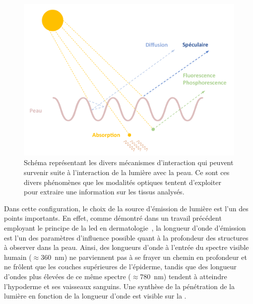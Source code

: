 \begin{figure}[H]
    \centering
    \includegraphics[width=\linewidth]{contents/chapter_2/resources/scheme_light_interaction.pdf}
    \caption{Schéma représentant les divers mécanismes d'interaction qui peuvent survenir suite à l'interaction de la lumière avec la peau. Ce sont ces divers phénomènes que les modalités optiques tentent d'exploiter pour extraire une information sur les tissus analysés.}
    \label{fig:scheme_light_interaction}
\end{figure}\par

Dans cette configuration, le choix de la source d'émission de lumière est l'un des points importants. En effet, comme démontré dans un travail précédent employant le principe de la \gls{led} en dermatologie~\cite{Barolet2008}, la longueur d'onde d'émission est l'un des paramètres d'influence possible quant à la profondeur des structures à observer dans la peau. Ainsi, des longueurs d'onde à l'entrée du spectre visible humain ($\approx$\SI{360}{\nano\metre}) ne parviennent pas à se frayer un chemin en profondeur et ne frôlent que les couches supérieures de l'épiderme, tandis que des longueur d'ondes plus élevées de ce même spectre ($\approx$\SI{780}{\nano\metre}) tendent à atteindre l'hypoderme et ses vaisseaux sanguins. Une synthèse de la pénétration de la lumière en fonction de la longueur d'onde est visible sur la .\par

